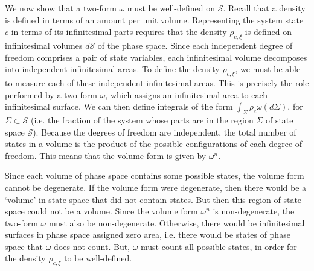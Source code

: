 \documentclass[12pt, english, twoside]{article} %
\begin{document}
We now show that a two-form $\omega$ must be well-defined on $\mathcal{S}$. Recall that a density is defined in terms of an amount per unit volume. Representing the system state $c$ in terms of its infinitesimal parts requires that the density $\rho_{c, \xi} $ is defined on infinitesimal volumes $d \mathcal{S}$ of the phase space. Since each independent degree of freedom comprises a pair of state variables, each infinitesimal volume decomposes into independent infinitesimal areas. To define the density $\rho_{c, \xi} $, we must be able to measure each of these independent infinitesimal areas. This is precisely the role performed by a two-form $\omega$, which assigns an infinitesimal area to each infinitesimal surface. We can then define integrals of the form $\int_{\Sigma} \rho_c \omega(d\Sigma)$, for $\Sigma \subset \mathcal{S}$ (i.e. the fraction of the system whose parts are in the region $\Sigma$ of state space $\mathcal{S}$). Because the degrees of freedom are independent, the total number of states in a volume is the product of the possible configurations of each degree of freedom. This means that the volume form is given by $\omega^n$. 

Since each volume of phase space contains some possible states, the volume form cannot be degenerate. If the volume form were degenerate, then there would be a `volume' in state space that did not contain states. But then this region of state space could not be a volume. Since the volume form $\omega^n$ is non-degenerate, the two-form $\omega$ must also be non-degenerate. Otherwise, there would be infinitesimal surfaces in phase space assigned zero area, i.e. there would be states of phase space that $\omega$ does not count. But, $\omega$ must count all possible states, in order for the density $\rho_{c, \xi} $ to be well-defined.

\end{document}
